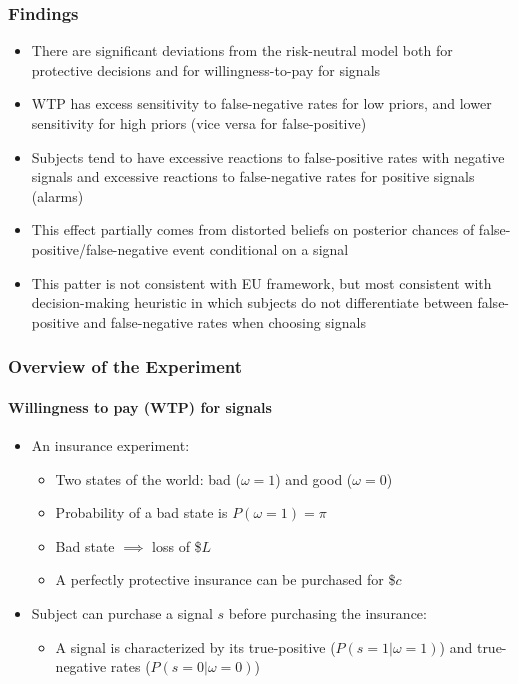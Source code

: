 \documentclass[11pt,hyperref={bookmarks=false}]{beamer}
\begin{document}
\begin{frame}
\frametitle{Findings}
\begin{itemize}
\item There are significant deviations from the risk-neutral model both for protective decisions and for willingness-to-pay for signals
\item WTP has excess sensitivity to false-negative rates for low priors, and lower sensitivity for high priors (vice versa for false-positive)
\item Subjects tend to have excessive reactions to false-positive rates with negative signals and excessive reactions to false-negative rates for positive signals (alarms)
\item This effect partially comes from distorted beliefs on posterior chances of false-positive/false-negative event conditional on a signal
\item This patter is not consistent with EU framework, but most consistent with decision-making heuristic in which subjects do not differentiate between false-positive and false-negative rates when choosing signals
\end{itemize}
\end{frame}


\begin{frame}
\frametitle{Overview of the Experiment}
\framesubtitle{Willingness to pay (WTP) for signals}
\begin{itemize}
	\item An insurance experiment:
		\begin{itemize}
			\item Two states of the world: bad ($\omega=1$) and good ($\omega=0$)
			\item Probability of a bad state is $P (\omega=1) = \pi$
			\item Bad state $\implies$ loss of \$$L$
			\item A perfectly protective insurance can be purchased for \$$c$
		\end{itemize}
	\item Subject can purchase a signal $s$ before purchasing the insurance:
		\begin{itemize}
			\item A signal is characterized by its true-positive ($P(s=1|\omega=1)$) and true-negative rates ($P(s=0|\omega=0)$) 
		\end{itemize}
\end{itemize}
\end{frame}
\end{document}
